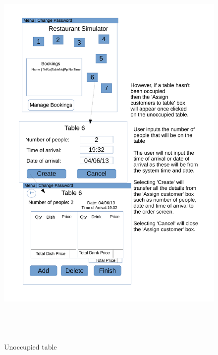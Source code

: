 \begin{figure}[H]
    \includegraphics[height = 20cm]{./Design/Images/Interface7}
    \caption{Unoccupied table} \label{fig:UnocTable}
\end{figure}

